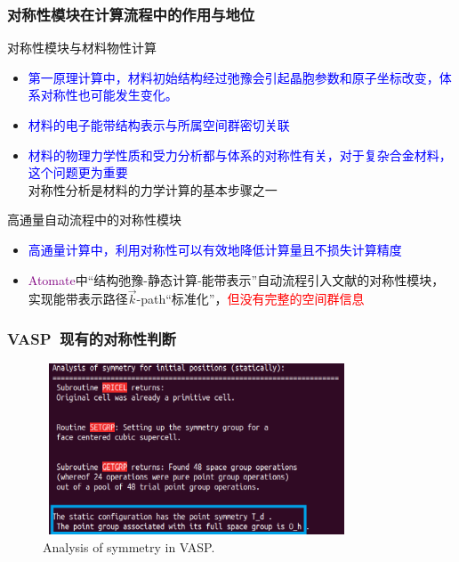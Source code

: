 \documentclass[cjk,slidestop,handout,compress,mathserif,blue]{beamer}	%
\begin{document}
\frame
{
	\frametitle{对称性模块在计算流程中的作用与地位}
	对称性模块与材料物性计算
	\begin{itemize}
		\item \textcolor{blue}{第一原理计算中，材料初始结构经过弛豫会引起晶胞参数和原子坐标改变，体系对称性也可能发生变化。}
		\item \textcolor{blue}{材料的电子能带结构表示与所属空间群密切关联}
		\item \textcolor{blue}{材料的物理力学性质和受力分析都与体系的对称性有关，对于复杂合金材料，这个问题更为重要}\\
			对称性分析是材料的力学计算的基本步骤之一
	\end{itemize}
	\vskip 20pt
	高通量自动流程中的对称性模块
	\begin{itemize}
		\item \textcolor{blue}{高通量计算中，利用对称性可以有效地降低计算量且不损失计算精度}
		\item \textcolor{purple}{\textrm{Atomate}}中“结构弛豫-静态计算-能带表示”自动流程引入文献\cite{CMS49-299_2010}的对称性模块，实现能带表示路径$\vec k$-\textrm{path}“标准化”，\textcolor{red}{但没有完整的空间群信息}
	\end{itemize}
}

\frame
{
	\frametitle{\textrm{VASP~}现有的对称性判断}
\begin{figure}[h!]
\centering
\hspace*{-0.28in}
\includegraphics[height=2.0in,width=3.6in,viewport=0 0 600 380,clip]{Figures/VASP_Symmetry.png}
\caption{\textrm{Analysis of symmetry in VASP.}}
\label{VASP_symmetry}
\end{figure}
}
\end{document}
